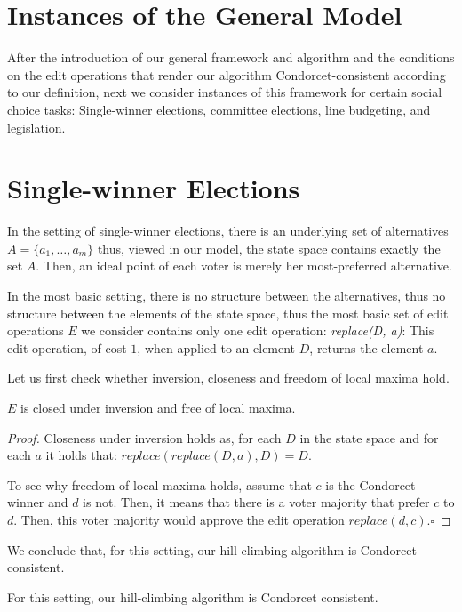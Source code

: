 \documentclass{llncs}
\newcommand{\qqed}{\hfill$\square$}
\begin{document}
\section{Instances of the General Model}

After the introduction of our general framework and algorithm and the conditions on the edit operations that render our algorithm Condorcet-consistent according to our definition, next we consider instances of this framework for certain social choice tasks:
  Single-winner elections,
  committee elections,
  line budgeting,
  and legislation.
  

\section{Single-winner Elections}

In the setting of single-winner elections, there is an underlying set of alternatives $A = \{a_1, \ldots, a_m\}$ thus, viewed in our model, the state space contains exactly the set $A$. Then, an ideal point of each voter is merely her most-preferred alternative.

In the most basic setting, there is no structure between the alternatives, thus no structure between the elements of the state space, thus the most basic set of edit operations $E$ we consider contains only one edit operation:
  \emph{replace(D, a)}:
    This edit operation, of cost $1$, when applied to an element $D$, returns the element $a$.

Let us first check whether inversion, closeness and freedom of local maxima hold.

\begin{lemma}
  $E$ is closed under inversion and free of local maxima.
\end{lemma}

\begin{proof}
%
Closeness under inversion holds as, for each $D$ in the state space and for each $a$ it holds that:
  $replace(replace(D, a), D) = D$.
  
To see why freedom of local maxima holds, assume that $c$ is the Condorcet winner and $d$ is not. Then, it means that there is a voter majority that prefer $c$ to $d$. Then, this voter majority would approve the edit operation $replace(d, c)$.\qqed
%
\end{proof}

We conclude that, for this setting, our hill-climbing algorithm is Condorcet consistent.

\begin{corollary}
  For this setting, our hill-climbing algorithm is Condorcet consistent.
\end{corollary}
\end{document}
